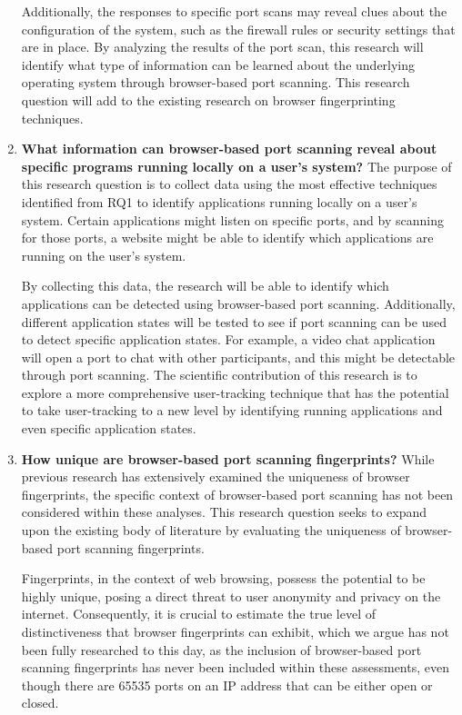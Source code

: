 \begin{enumerate}[RQ1.]
Additionally, the responses to specific port scans may reveal clues about the configuration of the system, such as the firewall rules or security settings that are in place. By analyzing the results of the port scan, this research will identify what type of information can be learned about the underlying operating system through browser-based port scanning. This research question will add to the existing research on browser fingerprinting techniques.

\item \textbf{What information can browser-based port scanning reveal about specific programs running locally on a user's system?} The purpose of this research question is to collect data using the most effective techniques identified from RQ1 to identify applications running locally on a user's system. Certain applications might listen on specific ports, and by scanning for those ports, a website might be able to identify which applications are running on the user's system.

By collecting this data, the research will be able to identify which applications can be detected using browser-based port scanning. Additionally, different application states will be tested to see if port scanning can be used to detect specific application states. For example, a video chat application will open a port to chat with other participants, and this might be detectable through port scanning. The scientific contribution of this research is to explore a more comprehensive user-tracking technique that has the potential to take user-tracking to a new level by identifying running applications and even specific application states.

\item \textbf{How unique are browser-based port scanning fingerprints?}
While previous research has extensively examined the uniqueness of browser fingerprints, the specific context of browser-based port scanning has not been considered within these analyses. This research question seeks to expand upon the existing body of literature by evaluating the uniqueness of browser-based port scanning fingerprints.

Fingerprints, in the context of web browsing, possess the potential to be highly unique, posing a direct threat to user anonymity and privacy on the internet. Consequently, it is crucial to estimate the true level of distinctiveness that browser fingerprints can exhibit, which we argue has not been fully researched to this day, as the inclusion of browser-based port scanning fingerprints has never been included within these assessments, even though there are 65535 ports on an IP address that can be either open or closed.
\end{enumerate}



